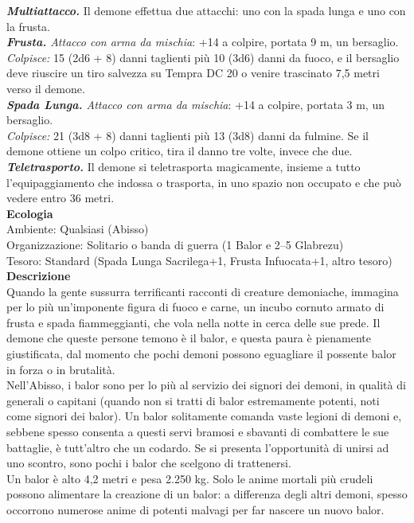 \begin{multicols}{2}
\emph{\textbf{Multiattacco.}} Il demone effettua due attacchi: uno con la spada lunga e uno con la frusta.\\
\emph{\textbf{Frusta.} Attacco con arma da mischia}: +14 a colpire, portata 9 m, un bersaglio.\\
\emph{Colpisce:} 15 (2d6 + 8) danni taglienti più 10 (3d6) danni da fuoco, e il bersaglio deve riuscire un tiro salvezza su Tempra DC 20 o venire trascinato 7,5 metri verso il demone.\\
\emph{\textbf{Spada Lunga.} Attacco con arma da mischia}: +14 a colpire, portata 3 m, un bersaglio.\\
\emph{Colpisce:} 21 (3d8 + 8) danni taglienti più 13 (3d8) danni da fulmine. Se il demone ottiene un colpo critico, tira il danno tre volte, invece che due.\\
\emph{\textbf{Teletrasporto.}} Il demone si teletrasporta magicamente, insieme a tutto l'equipaggiamento che indossa o trasporta, in uno spazio non occupato e che può vedere entro 36 metri.\\
\textbf{Ecologia}\\
Ambiente: Qualsiasi (Abisso)\\
Organizzazione: Solitario o banda di guerra (1 Balor e 2–5 Glabrezu)\\
Tesoro: Standard (Spada Lunga Sacrilega+1, Frusta Infuocata+1, altro tesoro)\\
\textbf{Descrizione}\\
Quando la gente sussurra terrificanti racconti di creature demoniache, immagina per lo più un’imponente figura di fuoco e carne, un incubo cornuto armato di frusta e spada fiammeggianti, che vola nella notte in cerca delle sue prede. Il demone che queste persone temono è il balor, e questa paura è pienamente giustificata, dal momento che pochi demoni possono eguagliare il possente balor in forza o in brutalità.\\
Nell’Abisso, i balor sono per lo più al servizio dei signori dei demoni, in qualità di generali o capitani (quando non si tratti di balor estremamente potenti, noti come signori dei balor). Un balor solitamente comanda vaste legioni di demoni e, sebbene spesso consenta a questi servi bramosi e sbavanti di combattere le sue battaglie, è tutt’altro che un codardo. Se si presenta l’opportunità di unirsi ad uno scontro, sono pochi i balor che scelgono di trattenersi.\\
Un balor è alto 4,2 metri e pesa 2.250 kg. Solo le anime mortali più crudeli possono alimentare la creazione di un balor: a differenza degli altri demoni, spesso occorrono numerose anime di potenti malvagi per far nascere un nuovo balor.\\


\end{multicols}
